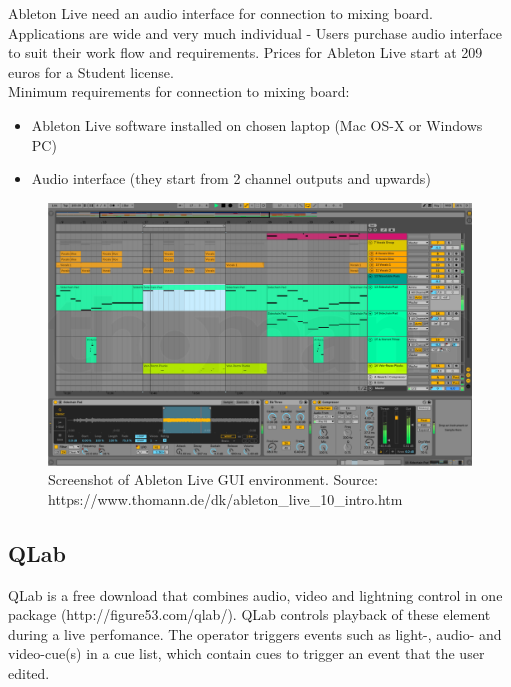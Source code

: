 Ableton Live need an audio interface for connection to mixing board. Applications are wide and very much individual - Users purchase audio interface to suit their work flow and requirements.  Prices for Ableton Live start at 209 euros for a Student license.\\

Minimum requirements for connection to mixing board: \\
\begin{itemize}
\item Ableton Live software installed on chosen laptop (Mac OS-X or Windows PC) \\
\item Audio interface (they start from 2 channel outputs and upwards) \\
\end{itemize}

\begin{figure}[H]
\centering
\includegraphics[scale=0.4]{./pictures/ableton.png}
\caption{Screenshot of Ableton Live GUI environment. Source: https://www.thomann.de/dk/ableton\_live\_10\_intro.htm}
\label{fig:ableton.png}
\end{figure}

\subsection{QLab}
QLab is a free download that combines audio, video and lightning control in one package (http://figure53.com/qlab/). QLab controls playback of these element during a live perfomance. The operator triggers events such as light-, audio- and video-cue(s) in a cue list, which contain cues to trigger an event that the user edited. \newline

